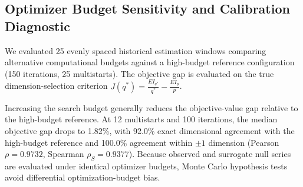 \documentclass[12pt]{article}
\begin{document}
\subsection{Optimizer Budget Sensitivity and Calibration Diagnostic}
We evaluated 25 evenly spaced historical estimation windows comparing alternative computational budgets against a high-budget reference configuration (150 iterations, 25 multistarts). The objective gap is evaluated on the true dimension-selection criterion $J(q^*) = \frac{EI_{q^*}}{q^*} - \frac{EI_p}{p}$.

\begin{table}[htbp]
\centering
\caption{Optimizer Budget Calibration Diagnostic on Selection Objective $J(q^*)$: Candidate Configurations vs. High-Budget Reference (25/150)}
\label{tab:app_optimizer_convergence}
\end{table}

Increasing the search budget generally reduces the objective-value gap relative to the high-budget reference. At 12 multistarts and 100 iterations, the median objective gap drops to 1.82\%, with 92.0\% exact dimensional agreement with the high-budget reference and 100.0\% agreement within $\pm 1$ dimension (Pearson $\rho = 0.9732$, Spearman $\rho_S = 0.9377$). Because observed and surrogate null series are evaluated under identical optimizer budgets, Monte Carlo hypothesis tests avoid differential optimization-budget bias.
\end{document}
